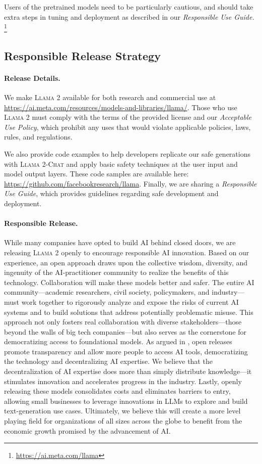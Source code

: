 \documentclass{article}
\newcommand{\modelname}{\textsc{Llama 2-Chat}\xspace}
\newcommand{\cinnamon}{\textsc{Llama 2}\xspace}
\begin{document}
Users of the pretrained models need to be particularly cautious, and should take extra steps in tuning and deployment as described in our \textit{Responsible Use Guide.} \footnote{\url{https://ai.meta.com/llama}}

\subsection{Responsible Release Strategy}
\label{sec:responsible_release_strategy}
\paragraph{Release Details.}
We make \cinnamon available for both research and commercial use at \url{https://ai.meta.com/resources/models-and-libraries/llama/}. Those who use \cinnamon must comply with the terms of the provided license and our \textit{Acceptable Use Policy}, which prohibit any uses that would violate applicable policies, laws, rules, and regulations.

We also provide code examples to help developers replicate our safe generations with \modelname and apply basic safety techniques at the user input and model output layers. These code samples are available here: \url{https://github.com/facebookresearch/llama}. Finally, we are sharing a \textit{Responsible Use Guide}, which provides guidelines regarding safe development and deployment.

\paragraph{Responsible Release.} While many companies have opted to build AI behind closed doors, we are releasing \cinnamon openly to encourage responsible AI innovation. Based on our experience, an open approach draws upon the collective wisdom, diversity, and ingenuity of the AI-practitioner community to realize the benefits of this technology. Collaboration will make these models better and safer. The entire AI community—academic researchers, civil society, policymakers, and industry—must work together to rigorously analyze and expose the risks of current AI systems and to build solutions that address potentially problematic misuse. This approach not only fosters real collaboration with diverse stakeholders—those beyond the walls of big tech companies—but also serves as the cornerstone for democratizing access to foundational models. As argued in \cite{zellers2019defending}, open releases promote transparency and allow more people to access AI tools, democratizing the technology and decentralizing AI expertise. We believe that the decentralization of AI expertise does more than simply distribute knowledge—it stimulates innovation and accelerates progress in the industry. Lastly, openly releasing these models consolidates costs and eliminates barriers to entry, allowing small businesses to leverage innovations in LLMs to explore and build text-generation use cases. Ultimately, we believe this will create a more level playing field for organizations of all sizes across the globe to benefit from the economic growth promised by the advancement of AI. 
\end{document}
